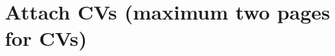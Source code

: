\documentclass[a4paper, 11pt]{article}
\begin{document}
\begin{thebibliography}{11}



\end{thebibliography}


	
	
	\section{Attach CVs (maximum two pages for CVs)}
	
\end{document}
